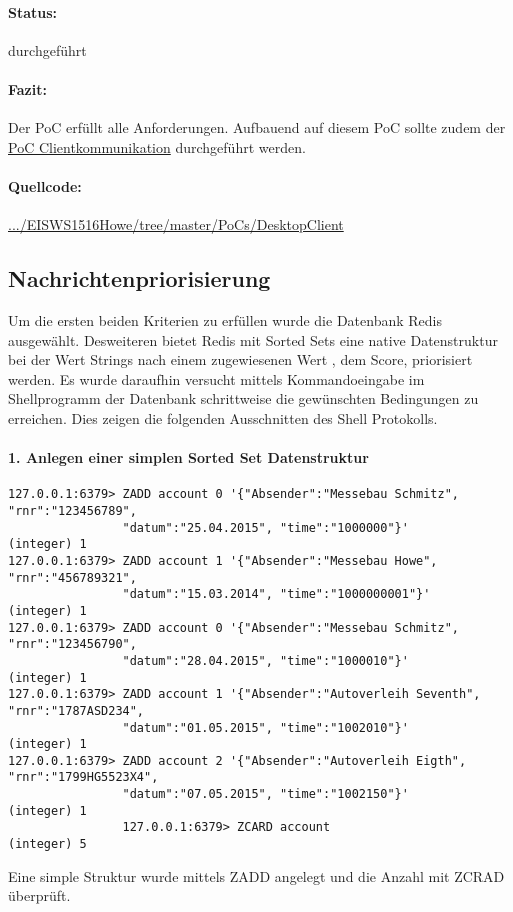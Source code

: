 \documentclass[11pt,oneside,a4paper,notitlepage]{article}
\begin{document}
\paragraph*{Status:} durchgeführt
\paragraph*{Fazit:} Der PoC erfüllt alle Anforderungen. Aufbauend auf diesem PoC sollte zudem der \href{}{PoC Clientkommunikation} durchgeführt werden.
\paragraph*{Quellcode: } \href{https://github.com/thuascgn/EISWS1516Howe/tree/master/MS3/PoCs/DesktopClient}{.../EISWS1516Howe/tree/master/PoCs/DesktopClient}

%
%
\subsection{Nachrichtenpriorisierung}
%
Um die ersten beiden Kriterien zu erfüllen wurde die Datenbank Redis ausgewählt. Desweiteren bietet Redis mit Sorted Sets eine native Datenstruktur bei der Wert Strings nach einem zugewiesenen Wert , dem Score, priorisiert werden. Es wurde daraufhin versucht mittels Kommandoeingabe im Shellprogramm der Datenbank schrittweise die gewünschten Bedingungen zu erreichen. Dies zeigen die folgenden Ausschnitten des Shell Protokolls.

\paragraph*{1. Anlegen einer simplen Sorted Set Datenstruktur}
\begin{verbatim}
127.0.0.1:6379> ZADD account 0 '{"Absender":"Messebau Schmitz", "rnr":"123456789", 
				"datum":"25.04.2015", "time":"1000000"}'
(integer) 1
127.0.0.1:6379> ZADD account 1 '{"Absender":"Messebau Howe", "rnr":"456789321", 
				"datum":"15.03.2014", "time":"1000000001"}'
(integer) 1
127.0.0.1:6379> ZADD account 0 '{"Absender":"Messebau Schmitz", "rnr":"123456790", 
				"datum":"28.04.2015", "time":"1000010"}'
(integer) 1
127.0.0.1:6379> ZADD account 1 '{"Absender":"Autoverleih Seventh", "rnr":"1787ASD234", 
				"datum":"01.05.2015", "time":"1002010"}'
(integer) 1
127.0.0.1:6379> ZADD account 2 '{"Absender":"Autoverleih Eigth", "rnr":"1799HG5523X4", 
				"datum":"07.05.2015", "time":"1002150"}'
(integer) 1
				127.0.0.1:6379> ZCARD account
(integer) 5
\end{verbatim}
Eine simple Struktur wurde mittels ZADD angelegt und die Anzahl mit ZCRAD überprüft.
\end{document}
